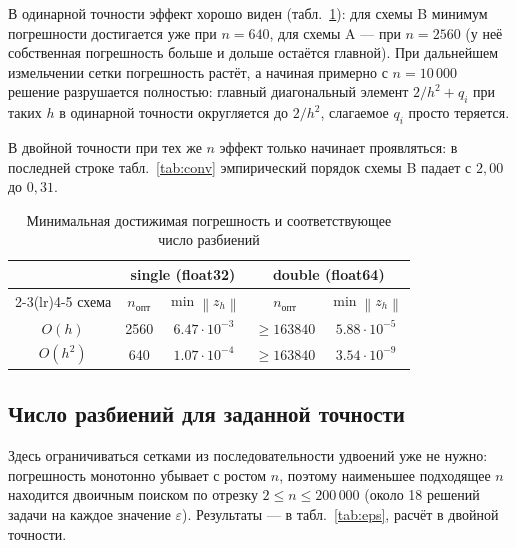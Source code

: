 \documentclass[12pt,a4paper]{article}
\newcommand{\norm}[1]{\left\|#1\right\|}
\begin{document}
В одинарной точности эффект хорошо виден (табл.~\ref{tab:minerr}): для
схемы B минимум погрешности достигается уже при $n=640$, для схемы A ---
при $n=2560$ (у неё собственная погрешность больше и дольше остаётся
главной). При дальнейшем измельчении сетки погрешность растёт, а начиная
примерно с $n=10\,000$ решение разрушается полностью: главный
диагональный элемент $2/h^2+q_i$ при таких $h$ в одинарной точности
округляется до $2/h^2$, слагаемое $q_i$ просто теряется.

В двойной точности при тех же $n$ эффект только начинает проявляться:
в последней строке табл.~\ref{tab:conv} эмпирический порядок схемы B
падает с $2{,}00$ до $0{,}31$.

\begin{table}[htbp]
\caption{Минимальная достижимая погрешность и соответствующее число
разбиений}
\label{tab:minerr}
\centering
\begin{tabular}{c c c c c}
\toprule
& \multicolumn{2}{c}{single (float32)} & \multicolumn{2}{c}{double (float64)}\\
\cmidrule(lr){2-3}\cmidrule(lr){4-5}
схема & $n_{\text{опт}}$ & $\min\norm{z_h}$ & $n_{\text{опт}}$ & $\min\norm{z_h}$\\
\midrule
$O(h)$ & 2560 & $6.47\cdot10^{-3}$ & $\ge 163840$ & $5.88\cdot10^{-5}$ \\
$O(h^2)$ & 640 & $1.07\cdot10^{-4}$ & $\ge 163840$ & $3.54\cdot10^{-9}$ \\
\bottomrule
\end{tabular}
\end{table}

\subsection{Число разбиений для заданной точности}

Здесь ограничиваться сетками из последовательности удвоений уже не
нужно: погрешность монотонно убывает с ростом $n$, поэтому наименьшее
подходящее $n$ находится двоичным поиском по отрезку $2\le n\le 200\,000$
(около 18 решений задачи на каждое значение $\varepsilon$). Результаты ---
в табл.~\ref{tab:eps}, расчёт в двойной точности.
\end{document}
